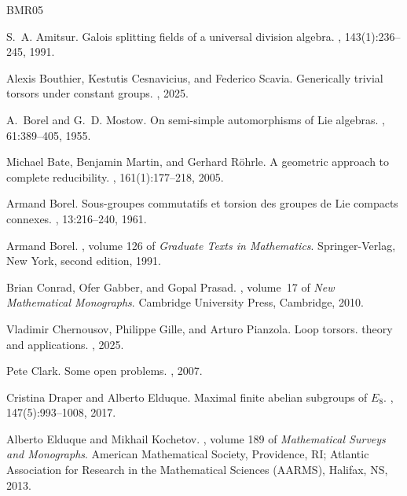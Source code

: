 \documentclass[12pt]{amsart}
\numberwithin{equation}{section}
\theoremstyle{remark}
\begin{document}
\begin{thebibliography}{BMR05}

S.~A. Amitsur.
\newblock Galois splitting fields of a universal division algebra.
, 143(1):236--245, 1991.

Alexis Bouthier, Kestutis Cesnavicius, and Federico Scavia.
\newblock Generically trivial torsors under constant groups.
, 2025.

A.~Borel and G.~D. Mostow.
\newblock On semi-simple automorphisms of {L}ie algebras.
, 61:389--405, 1955.

Michael Bate, Benjamin Martin, and Gerhard R\"ohrle.
\newblock A geometric approach to complete reducibility.
, 161(1):177--218, 2005.

Armand Borel.
\newblock Sous-groupes commutatifs et torsion des groupes de {L}ie compacts connexes.
, 13:216--240, 1961.

Armand Borel.
, volume 126 of {\em Graduate Texts in Mathematics}.
\newblock Springer-Verlag, New York, second edition, 1991.

Brian Conrad, Ofer Gabber, and Gopal Prasad.
, volume~17 of {\em New Mathematical Monographs}.
\newblock Cambridge University Press, Cambridge, 2010.

Vladimir Chernousov, Philippe Gille, and Arturo Pianzola.
\newblock Loop torsors. theory and applications.
, 2025.

Pete Clark.
\newblock Some open problems.
, 2007.

Cristina Draper and Alberto Elduque.
\newblock Maximal finite abelian subgroups of {$E_8$}.
, 147(5):993--1008, 2017.

Alberto Elduque and Mikhail Kochetov.
, volume 189 of {\em Mathematical Surveys and Monographs}.
\newblock American Mathematical Society, Providence, RI; Atlantic Association for Research in the Mathematical Sciences (AARMS), Halifax, NS, 2013.


\end{thebibliography}
\end{document}
